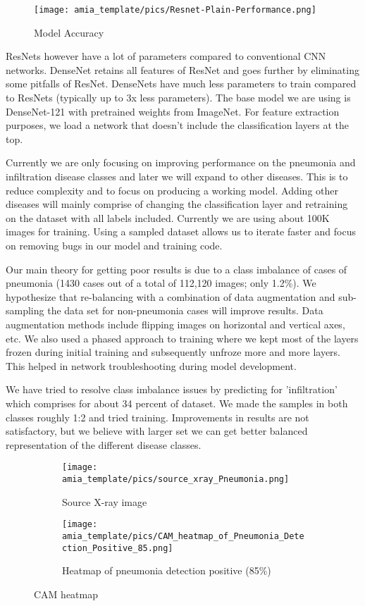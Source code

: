 \documentclass{amia}
\begin{document}
\begin{figure}[h!]
\centering
\texttt{[image: amia\_template/pics/Resnet-Plain-Performance.png]}
\caption{Model Accuracy}
\label{fig3}
\end{figure}


ResNets however have a lot of parameters compared to conventional CNN networks. DenseNet retains all features of ResNet and goes further by eliminating some pitfalls of ResNet. DenseNets have much less parameters to train compared to ResNets (typically up to 3x less parameters). The base model we are using is DenseNet-121 with pretrained weights from ImageNet. For feature extraction purposes, we load a network that doesn't include the classification layers at the top.

Currently we are only focusing on improving performance on the pneumonia and infiltration disease classes and later we will expand to other diseases. This is to reduce complexity and to focus on producing a working model. Adding other diseases will mainly comprise of changing the classification layer and retraining on the dataset with all labels included. Currently we are using about 100K images for training. Using a sampled dataset allows us to iterate faster and focus on removing bugs in our model and training code.

Our main theory for getting poor results is due to a class imbalance of cases of pneumonia (1430 cases out of a total of 112,120 images; only 1.2\%). We hypothesize that re-balancing with a combination of data augmentation and sub-sampling the data set for non-pneumonia cases will improve results. Data augmentation methods include  flipping images on horizontal and vertical axes, etc. We also used a phased approach to training where we kept most of the layers frozen during initial training and subsequently unfroze more and more layers. This helped in network troubleshooting during model development.

We have tried to resolve class imbalance issues by predicting for 'infiltration' which comprises for about 34 percent of dataset. We made the samples in both classes roughly 1:2 and tried training. Improvements in results are not satisfactory, but we believe with larger set we can get better balanced representation of the different disease classes.

\bigskip

\begin{figure}
\centering
\begin{subfigure}{.4\textwidth}
  \centering
  \texttt{[image: amia\_template/pics/source\_xray\_Pneumonia.png]}
  \caption{Source X-ray image}
  \label{fig:sub1}
\end{subfigure}
\begin{subfigure}{.4\textwidth}
  \centering
  \texttt{[image: amia\_template/pics/CAM\_heatmap\_of\_Pneumonia\_Detection\_Positive\_85.png]}
  \caption{Heatmap of pneumonia detection positive (85\%)}
  \label{fig:sub2}
\end{subfigure}
\caption{CAM heatmap \cite{ref5} }
\label{fig:cam_heatmap}
\end{figure}
\end{document}
